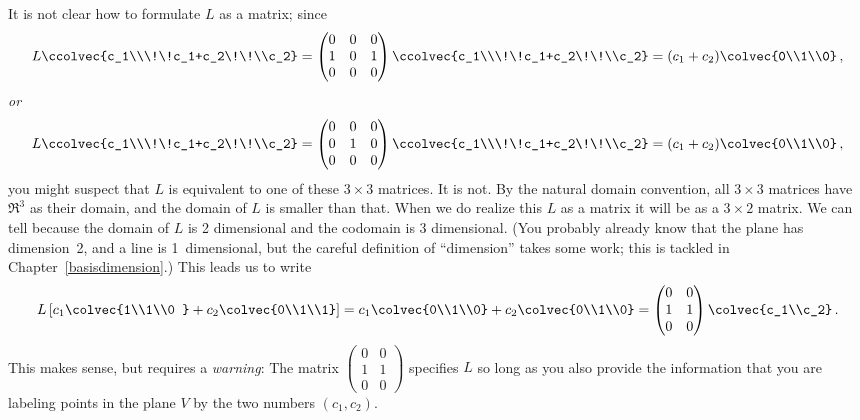 \begin{example}
It is not clear how to formulate $L$ as a matrix; 
since
\[
L\ccolvec{c_1\\\!\!c_1+c_2\!\!\\c_2} = 
\begin{pmatrix}
0&0&0\\
1&0&1\\
0&0&0
\end{pmatrix}
\ccolvec{c_1\\\!\!c_1+c_2\!\!\\c_2} =(c_1+c_2)\colvec{0\\1\\0}\, ,
\]
{\itshape or} 
\[
L\ccolvec{c_1\\\!\!c_1+c_2\!\!\\c_2} = 
\begin{pmatrix}
0&0&0\\
0&1&0\\
0&0&0
\end{pmatrix}
\ccolvec{c_1\\\!\!c_1+c_2\!\!\\c_2} =(c_1+c_2)\colvec{0\\1\\0}\, ,
\]
you might suspect that  $L$ is equivalent to one of these $3\times3$ matrices. It is not. By the natural domain convention, all $3\times3$ matrices have $\Re^3$ as their domain, and the domain of $L$ is smaller than that. 
When we do realize this $L$ as a matrix it will be as a  $3\times2$ matrix. We can tell because the domain of $L$ is 2 dimensional and the codomain is $3$ dimensional. (You probably already know that the plane has dimension~2, and a line is 1~dimensional, but the careful definition of ``dimension'' takes some work; this is tackled in Chapter~\ref{basisdimension}.) This leads us to write
\[
L\left[ c_1\colvec{1\\1\\0 } + c_2 \colvec{0\\1\\1} \right]=c_1\colvec{0\\1\\0}+c_2\colvec{0\\1\\0}=\begin{pmatrix}0&0\\1&1\\0&0\end{pmatrix}\colvec{c_1\\c_2}\, .
\]
This makes sense, but requires a {\itshape warning}: The matrix $\begin{pmatrix}0&0\\1&1\\0&0\end{pmatrix}$ specifies $L$  so long as you also provide the information that you are labeling points in the plane $V$
by the two numbers $(c_1,c_2)$.
\end{example} 




